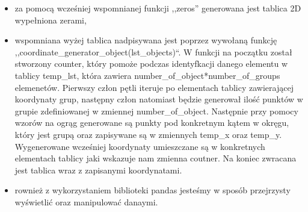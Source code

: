 \documentclass[11pt]{article}
\providecommand{\tightlist}{%
      \setlength{\itemsep}{0pt}\setlength{\parskip}{0pt}}
\begin{document}
\begin{itemize}
\tightlist
\item
  za pomocą wcześniej wspomnianej funkcji ,,zeros'' generowana jest
  tablica 2D wypełniona zerami,
\item
  wspomniana wyżej tablica nadpisywana jest poprzez wywołaną funkcję
  ,,coordinate\_generator\_object(lst\_objects)``. W funkcji na początku
  został stworzony counter, który pomoże podczas identyfkacji danego
  elementu w tablicy temp\_lst, która zawiera
  number\_of\_object*number\_of\_groups elemenetów. Pierwszy człon pętli
  iteruje po elementach tablicy zawierającej koordynaty grup, następny
  człon natomiast będzie generował ilość punktów w grupie zdefiniowanej
  w zmiennej number\_of\_object. Następnie przy pomocy wzorów na ogrąg
  generowane są punkty pod konkretnym kątem w okręgu, który jest grupą
  oraz zapisywane są w zmiennych temp\_x oraz temp\_y. Wygenerowane
  wcześniej koordynaty umieszczane są w konkretnych elementach tablicy
  jaki wskazuje nam zmienna coutner. Na koniec zwracana jest tablica
  wraz z zapisanymi koordynatami.
\item
  rownież z wykorzystaniem biblioteki pandas jesteśmy w sposób
  przejrzysty wyświetlić oraz manipulować danaymi.
\end{itemize}
\end{document}
